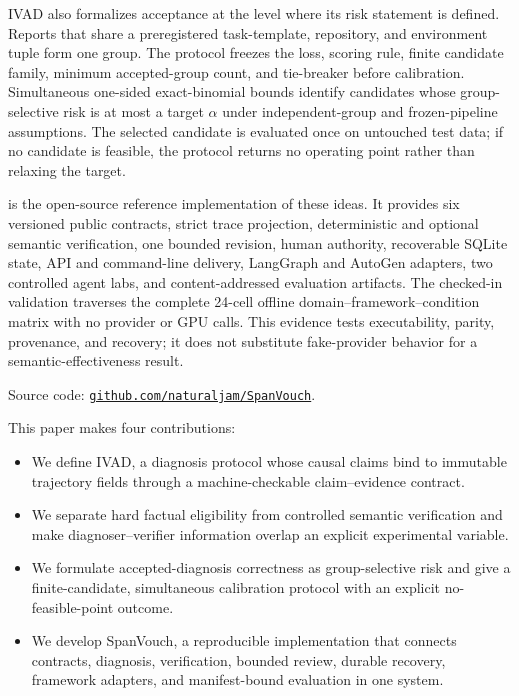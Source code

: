 IVAD also formalizes acceptance at the level where its risk statement is
defined. Reports that share a preregistered task-template, repository, and
environment tuple form one group. The protocol freezes the loss, scoring rule,
finite candidate family, minimum accepted-group count, and tie-breaker before
calibration. Simultaneous one-sided exact-binomial bounds identify candidates
whose group-selective risk is at most a target $\alpha$ under independent-group
and frozen-pipeline assumptions. The selected candidate is evaluated once on
untouched test data; if no candidate is feasible, the protocol returns no
operating point rather than relaxing the target.

\system is the open-source reference implementation of these ideas. It
provides six versioned public contracts, strict trace projection, deterministic
and optional semantic verification, one bounded revision, human authority,
recoverable SQLite state, API and command-line delivery, LangGraph and AutoGen
adapters, two controlled agent labs, and content-addressed evaluation
artifacts. The checked-in validation traverses the complete 24-cell offline
domain--framework--condition matrix with no provider or GPU calls. This
evidence tests executability, parity, provenance, and recovery; it does not
substitute fake-provider behavior for a semantic-effectiveness result.

\begin{anonsuppress}
Source code: \href{https://github.com/naturaljam/SpanVouch}
{\nolinkurl{github.com/naturaljam/SpanVouch}}.
\end{anonsuppress}

This paper makes four contributions:
\begin{itemize}
    \item We define IVAD, a diagnosis protocol whose causal claims bind to
    immutable trajectory fields through a machine-checkable claim--evidence
    contract.
    \item We separate hard factual eligibility from controlled semantic
    verification and make diagnoser--verifier information overlap an explicit
    experimental variable.
    \item We formulate accepted-diagnosis correctness as group-selective risk
    and give a finite-candidate, simultaneous calibration protocol with an
    explicit no-feasible-point outcome.
    \item We develop SpanVouch, a reproducible implementation that connects
    contracts, diagnosis, verification, bounded review, durable recovery,
    framework adapters, and manifest-bound evaluation in one system.
\end{itemize}
